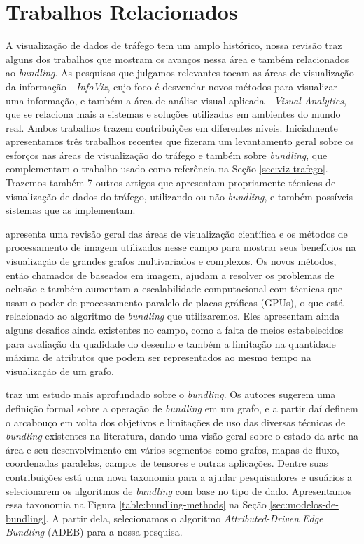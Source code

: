 \chapter{Trabalhos Relacionados}
\label{cap:trabalhos-relacionados}

  A visualização de dados de tráfego tem um amplo histórico, nossa revisão traz
alguns dos trabalhos que mostram os avanços nessa área e também relacionados ao
\emph{bundling}. As pesquisas que julgamos relevantes tocam as áreas de
visualização da informação - \emph{InfoViz}, cujo foco é desvendar novos
métodos para visualizar uma informação, e também a área de análise visual
aplicada - \emph{Visual Analytics}, que se relaciona mais a sistemas e soluções
utilizadas em ambientes do mundo real. Ambos trabalhos trazem contribuições em
diferentes níveis. Inicialmente apresentamos três trabalhos recentes que
fizeram um levantamento geral sobre os esforços nas áreas de visualização do
tráfego e também sobre \emph{bundling}, que complementam o trabalho usado
como referência na Seção \ref{sec:viz-trafego}. Trazemos também 7 outros artigos
que apresentam propriamente técnicas de visualização de dados do tráfego,
utilizando ou não \emph{bundling}, e também possíveis sistemas que as
implementam.

  \citet{Telea2018} apresenta uma revisão geral das áreas de visualização
científica e os métodos de processamento de imagem utilizados nesse campo para
mostrar seus benefícios na visualização de grandes grafos multivariados e
complexos. Os novos métodos, então chamados de baseados em imagem, ajudam a
resolver os problemas de oclusão e também aumentam a escalabilidade
computacional com técnicas que usam o poder de processamento paralelo de placas
gráficas (GPUs), o que está relacionado ao algoritmo de \emph{bundling} que
utilizaremos. Eles apresentam ainda alguns desafios ainda existentes no
campo, como a falta de meios estabelecidos para avaliação da qualidade do
desenho e também a limitação na quantidade máxima de atributos que podem ser
representados ao mesmo tempo na visualização de um grafo.

  \citet{Lhuillier2017} traz um estudo mais aprofundado sobre o
\emph{bundling}. Os autores sugerem uma definição formal sobre a operação de
\emph{bundling} em um grafo, e a partir daí definem o arcabouço em volta dos
objetivos e limitações de uso das diversas técnicas de \emph{bundling}
existentes na literatura, dando uma visão geral sobre o estado da arte na área
e seu desenvolvimento em vários segmentos como grafos, mapas de fluxo,
coordenadas paralelas, campos de tensores e outras aplicações. Dentre suas
contribuições está uma nova taxonomia para a ajudar pesquisadores e usuários a
selecionarem os algoritmos de \emph{bundling} com base no tipo de dado.
Apresentamos essa taxonomia na Figura \ref{table:bundling-methods} na Seção
\ref{sec:modelos-de-bundling}. A partir dela, selecionamos o algoritmo
\emph{Attributed-Driven Edge Bundling} (ADEB) para a nossa pesquisa.

